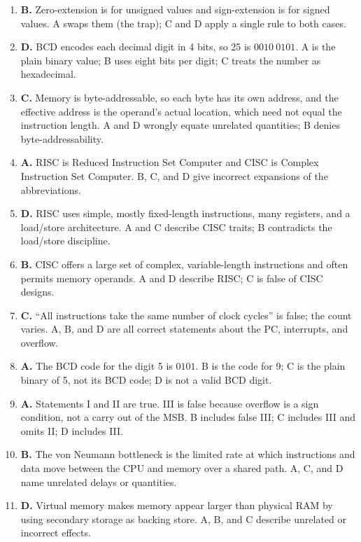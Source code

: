 \begin{enumerate}[label=\textbf{Q\arabic*.}, leftmargin=*]
  yields an opposite-sign result. A is the trap (carry out of the MSB); B and
  C misstate the condition.
\item \textbf{B.} Zero-extension is for unsigned values and sign-extension is
  for signed values. A swaps them (the trap); C and D apply a single rule to
  both cases.
\item \textbf{D.} BCD encodes each decimal digit in 4 bits, so 25 is
  $0010\ 0101$. A is the plain binary value; B uses eight bits per digit; C
  treats the number as hexadecimal.
\item \textbf{C.} Memory is byte-addressable, so each byte has its own
  address, and the effective address is the operand's actual location, which
  need not equal the instruction length. A and D wrongly equate unrelated
  quantities; B denies byte-addressability.
\item \textbf{A.} RISC is Reduced Instruction Set Computer and CISC is
  Complex Instruction Set Computer. B, C, and D give incorrect expansions of
  the abbreviations.
\item \textbf{D.} RISC uses simple, mostly fixed-length instructions, many
  registers, and a load/store architecture. A and C describe CISC traits; B
  contradicts the load/store discipline.
\item \textbf{B.} CISC offers a large set of complex, variable-length
  instructions and often permits memory operands. A and D describe RISC; C is
  false of CISC designs.
\item \textbf{C.} ``All instructions take the same number of clock cycles'' is
  false; the count varies. A, B, and D are all correct statements about the PC,
  interrupts, and overflow.
\item \textbf{A.} The BCD code for the digit 5 is $0101$. B is the code for 9;
  C is the plain binary of 5, not its BCD code; D is not a valid BCD digit.
\item \textbf{A.} Statements I and II are true. III is false because overflow
  is a sign condition, not a carry out of the MSB. B includes false III; C
  includes III and omits II; D includes III.
\item \textbf{B.} The von Neumann bottleneck is the limited rate at which
  instructions and data move between the CPU and memory over a shared path. A,
  C, and D name unrelated delays or quantities.
\item \textbf{D.} Virtual memory makes memory appear larger than physical RAM
  by using secondary storage as backing store. A, B, and C describe unrelated
  or incorrect effects.


\end{enumerate}
